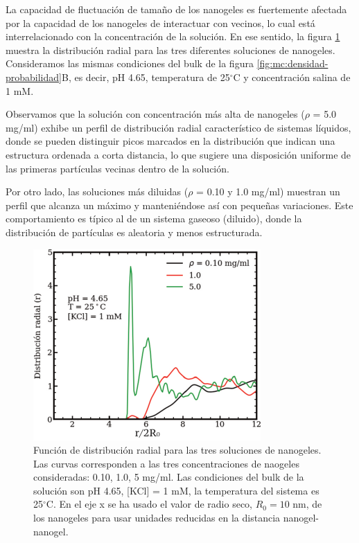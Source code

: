 	La capacidad de fluctuaci\'on de tama\~no de los nanogeles es fuertemente afectada por la capacidad de los nanogeles de interactuar con vecinos, lo cual est\'a interrelacionado con la concentraci\'on de la soluci\'on.
	En ese sentido, la figura \ref{fig:mc:rdf} muestra la distribuci\'on radial para las tres diferentes soluciones de nanogeles. Consideramos las mismas condiciones del bulk de la figura \ref{fig:mc:densidad-probabilidad}B, es decir, pH 4.65, temperatura de 25$^\circ$C y concentraci\'on salina de 1 mM.
	
	Observamos que la soluci\'on con concentraci\'on m\'as alta de nanogeles ($\rho$ = 5.0 mg/ml) exhibe un perfil de distribuci\'on radial caracter\'istico de sistemas l\'iquidos, donde se pueden distinguir picos marcados en la distribuci\'on que indican una estructura ordenada a corta distancia, lo que sugiere una disposici\'on uniforme de las primeras part\'iculas vecinas dentro de la soluci\'on.
	
	Por otro lado, las soluciones m\'as diluidas ($\rho$ = 0.10 y 1.0 mg/ml) muestran un perfil que alcanza  un m\'aximo y manteni\'endose as\'i con peque\~nas variaciones. Este comportamiento es t\'ipico al de un sistema gaseoso (diluido), donde la distribuci\'on de part\'iculas es  aleatoria y menos estructurada.
	
	
	\begin{figure}
		\centering
		\includegraphics[width=0.45\linewidth]{Figures/graph-mc/rdf.pdf}
		\caption{Funci\'on de distribuci\'on radial para las tres soluciones de nanogeles. Las curvas corresponden a las tres concentraciones de naogeles consideradas: 0.10, 1.0, 5 mg/ml. Las condiciones del bulk de la soluci\'on son pH 4.65, [KCl] = 1 mM, la temperatura del sistema es 25$^\circ$C. En el eje x se ha usado el valor de radio seco, $R_0 = 10 $ nm, de los nanogeles para usar unidades reducidas en la distancia nanogel-nanogel.}
		\label{fig:mc:rdf}
	\end{figure}
	
